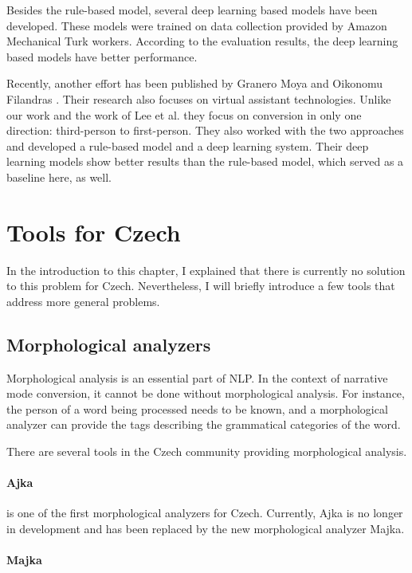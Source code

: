 Besides the rule-based model, several deep learning based models have been developed. These models were trained on data collection provided by Amazon Mechanical Turk workers. According to the evaluation results, the deep learning based models have better performance.

Recently, another effort has been published by Granero Moya and Oikonomu Filandras \cite{granero-moya-oikonomou-filandras-2021-taking}. Their research also focuses on virtual assistant technologies. Unlike our work and the work of Lee et al. they focus on conversion in only one direction: third-person to first-person. They also worked with the two approaches and developed a rule-based model and a deep learning system. Their deep learning models show better results than the rule-based model, which served as a baseline here, as well.

\section{Tools for Czech}

In the introduction to this chapter, I explained that there is currently no solution to this problem for Czech. Nevertheless, I will briefly introduce a few tools that address more general problems.

\subsection{Morphological analyzers}

Morphological analysis is an essential part of NLP. In the context of narrative mode conversion, it cannot be done without morphological analysis. For instance, the person of a word being processed needs to be known, and a morphological analyzer can provide the tags describing the grammatical categories of the word.

There are several tools in the Czech community providing morphological analysis.

\paragraph{Ajka}

is one of the first morphological analyzers for Czech. Currently, Ajka is no longer in development and has been replaced by the new morphological analyzer Majka. \cite{Sedlacekthesis}

\paragraph{Majka}

